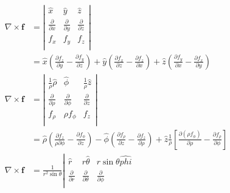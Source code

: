 \documentclass{article}
\numberwithin{equation}{section}
\renewcommand{\vec}[1]{\boldsymbol{#1}}
\begin{document}
\begin{align}
    \nabla \times \vec{f}&=
                            \left| 
                                \begin{matrix}
                                    \hat{x} & \hat{y} & \hat{z} \\
                                    \frac{\partial}{\partial x} & \frac{\partial}{\partial y} & \frac{\partial}{\partial z} \\
                                    f_x & f_y & f_z \\
                                \end{matrix}
                            \right| \nonumber \\
                         &=\hat{x}\left(\frac{\partial f_z}{\partial y}- \frac{\partial f_y}{\partial z}\right)+\hat{y}\left(\frac{\partial f_x}{\partial z}- \frac{\partial f_z}{\partial x}\right)+\hat{z}\left(\frac{\partial f_y}{\partial x}- \frac{\partial f_x}{\partial y}\right) \\
    \nabla \times \vec{f}&=
                            \left| 
                                \begin{matrix}
                                    \frac{1}{\rho}\hat{\rho} & \hat{\phi} & \frac{1}{\rho}\hat{z} \\
                                    \frac{\partial}{\partial \rho} & \frac{\partial}{\partial \phi} & \frac{\partial}{\partial z} \\
                                    f_{\rho} & \rho f_{\phi} & f_z \\
                                \end{matrix}
                            \right| \nonumber \\
                         &=\hat{\rho}\left(\frac{\partial f_z}{\rho \partial \phi}-\frac{\partial f_{\phi}}{\partial z}\right)-\hat{\phi}\left(\frac{\partial f_{\rho}}{\partial z}-\frac{\partial f_z}{\partial \rho}\right)+\hat{z}\frac{1}{\rho}\left[\frac{\partial (\rho f_{\phi})}{\partial \rho}-\frac{\partial f_{\rho}}{\partial \phi}\right] \\
    \nabla \times \vec{f}&=\frac{1}{r^2\sin\theta}
                            \left| 
                                \begin{matrix}
                                    \hat{r} & r\hat{\theta} & r\sin\theta\hat{phi} \\
                                    \frac{\partial}{\partial r} & \frac{\partial}{\partial \theta} & \frac{\partial}{\partial \phi} \\

\end{matrix}
\end{align}
\end{document}
